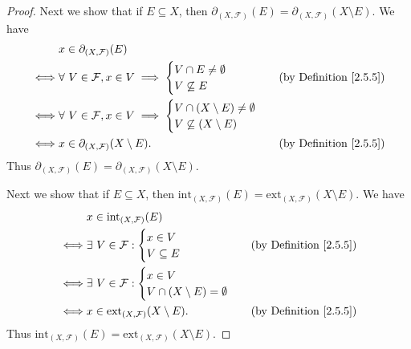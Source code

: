 \begin{proof}
    Next we show that if \(E \subseteq X\), then \(\partial_{(X, \mathcal{F})}(E) = \partial_{(X, \mathcal{F})}(X \setminus E)\).
    We have
    \begin{align*}
             & x \in \partial_{(X, \mathcal{F})}(E)                                                                          \\
        \iff & \forall\ V \in \mathcal{F}, x \in V \implies \begin{cases}
            V \cap E \neq \emptyset \\
            V \not\subseteq E
        \end{cases} & \text{(by Definition \ref{2.5.5})} \\
        \iff & \forall\ V \in \mathcal{F}, x \in V \implies \begin{cases}
            V \cap (X \setminus E) \neq \emptyset \\
            V \not\subseteq (X \setminus E)
        \end{cases}                                      \\
        \iff & x \in \partial_{(X, \mathcal{F})}(X \setminus E).                        & \text{(by Definition \ref{2.5.5})}
    \end{align*}
    Thus \(\partial_{(X, \mathcal{F})}(E) = \partial_{(X, \mathcal{F})}(X \setminus E)\).

    Next we show that if \(E \subseteq X\), then \(\text{int}_{(X, \mathcal{F})}(E) = \text{ext}_{(X, \mathcal{F})}(X \setminus E)\).
    We have
    \begin{align*}
             & x \in \text{int}_{(X, \mathcal{F})}(E)                                                        \\
        \iff & \exists\ V \in \mathcal{F} : \begin{cases}
            x \in V \\
            V \subseteq E
        \end{cases} & \text{(by Definition \ref{2.5.5})} \\
        \iff & \exists\ V \in \mathcal{F} : \begin{cases}
            x \in V \\
            V \cap (X \setminus E) = \emptyset
        \end{cases}                                      \\
        \iff & x \in \text{ext}_{(X, \mathcal{F})}(X \setminus E).      & \text{(by Definition \ref{2.5.5})}
    \end{align*}
    Thus \(\text{int}_{(X, \mathcal{F})}(E) = \text{ext}_{(X, \mathcal{F})}(X \setminus E)\).


\end{proof}
